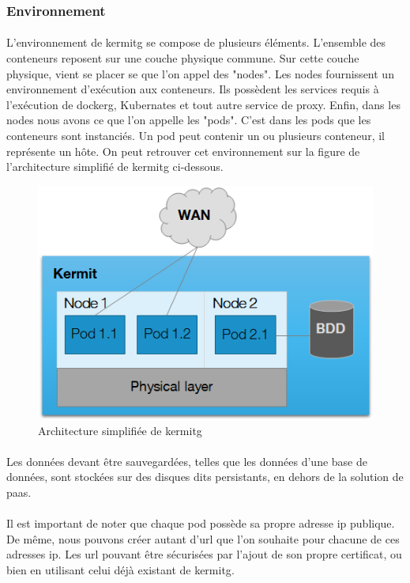 \documentclass[12pt,a4paper]{report}
\begin{document}
\subsubsection{Environnement}
\paragraph*{}L'environnement de \gls{kermitg} se compose de plusieurs éléments. L'ensemble des conteneurs reposent sur une couche physique commune. Sur cette couche physique, vient se placer se que l'on appel des "nodes". Les nodes fournissent un environnement d'exécution aux conteneurs. Ils possèdent les services requis à l'exécution de \gls{dockerg}, Kubernates et tout autre service de proxy. Enfin, dans les nodes nous avons ce que l'on appelle les "pods". C'est dans les pods que les conteneurs sont instanciés. Un pod peut contenir un ou plusieurs conteneur, il représente un hôte. On peut retrouver cet environnement sur la figure de l'architecture simplifié de \gls{kermitg} ci-dessous. 
\begin{figure}[!ht]
    \center
    \includegraphics[scale=0.86]{./img/archi_kermit.png}
    \caption{Architecture simplifiée de \gls{kermitg}}
\end{figure}
\paragraph*{}Les données devant être sauvegardées, telles que les données d'une base de données, sont stockées sur des disques dits persistants, en dehors de la solution de \gls{paas}.
\paragraph*{}Il est important de noter que chaque pod possède sa propre adresse \gls{ip} publique. De même, nous pouvons créer autant d'\gls{url} que l'on souhaite pour chacune de ces adresses \gls{ip}. Les \gls{url} pouvant être sécurisées par l'ajout de son propre certificat, ou bien en utilisant celui déjà existant de \gls{kermitg}. 
\end{document}
